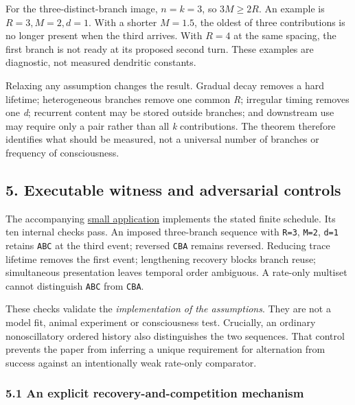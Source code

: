 \documentclass[
  american,
  11pt,
  letterpaper,
]{article}
\begin{document}
For the three-distinct-branch image, \(n=k=3\), so \(3M\geq2R\). An example is \(R=3,M=2,d=1\). With a shorter \(M=1.5\), the oldest of three contributions is no longer present when the third arrives. With \(R=4\) at the same spacing, the first branch is not ready at its proposed second turn. These examples are diagnostic, not measured dendritic constants.

Relaxing any assumption changes the result. Gradual decay removes a hard lifetime; heterogeneous branches remove one common \emph{R}; irregular timing removes one \emph{d}; recurrent content may be stored outside branches; and downstream use may require only a pair rather than all \emph{k} contributions. The theorem therefore identifies what should be measured, not a universal number of branches or frequency of consciousness.

\subsection{5. Executable witness and adversarial controls}\label{executable-witness-and-adversarial-controls}

The accompanying \href{https://github.com/v5ma/v5ma.github.io/blob/f6d3867df89ae9dea32f763b1d55c84212c41cc6/papers/companions/five-papers-20260923/temporal/paper/applications/temporal-ensemble-v01/model.py}{small application} implements the stated finite schedule. Its ten internal checks pass. An imposed three-branch sequence with \texttt{R=3}, \texttt{M=2}, \texttt{d=1} retains \texttt{ABC} at the third event; reversed \texttt{CBA} remains reversed. Reducing trace lifetime removes the first event; lengthening recovery blocks branch reuse; simultaneous presentation leaves temporal order ambiguous. A rate-only multiset cannot distinguish \texttt{ABC} from \texttt{CBA}.

These checks validate the \emph{implementation of the assumptions}. They are not a model fit, animal experiment or consciousness test. Crucially, an ordinary nonoscillatory ordered history also distinguishes the two sequences. That control prevents the paper from inferring a unique requirement for alternation from success against an intentionally weak rate-only comparator.

\subsubsection{5.1 An explicit recovery-and-competition mechanism}\label{an-explicit-recovery-and-competition-mechanism}
\end{document}
